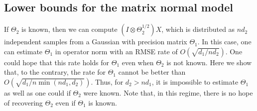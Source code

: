 \documentclass[aos]{imsart}
\theoremstyle{definition}
\numberwithin{equation}{section}
\newcommand{\ot}{\otimes}
\begin{document}
\subsection{Lower bounds for the matrix normal model}

If $\Theta_2$ is known, then we can compute $(I \ot \Theta_2^{1/2} )X$, which is distributed as $nd_2$ independent samples from a Gaussian with precision matrix $\Theta_1$. In this case, one can estimate $\Theta_1$ in operator norm with an RMSE rate of $O(\sqrt{ d_1/ n d_2})$. One could hope that this rate holds for $\Theta_1$ even when $\Theta_2$ is not known. Here we show that, to the contrary, the rate for $\Theta_1$ cannot be better than $O(\sqrt{d_1/ n \min(n d_1, d_2)})$. Thus, for $d_2 > n d_1$, it is impossible to estimate $\Theta_1$ as well as one could if $\Theta_2$ were known. Note that, in this regime, there is no hope of recovering $\Theta_2$ even if $\Theta_1$ is known.

\end{document}
